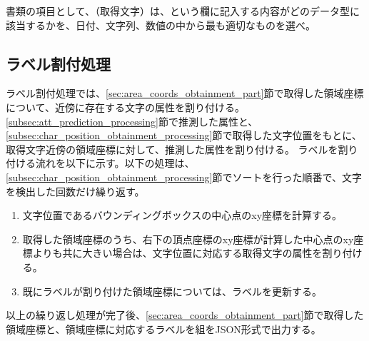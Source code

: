 書類の項目として、（取得文字）は、という欄に記入する内容がどのデータ型に該当するかを、日付、文字列、数値の中から最も適切なものを選べ。

\subsection{ラベル割付処理}\label{subsec:label_link_processing}
ラベル割付処理では、\ref{sec:area_coords_obtainment_part}節で取得した領域座標について、近傍に存在する文字の属性を割り付ける。
\ref{subsec:att_prediction_processing}節で推測した属性と、\ref{subsec:char_position_obtainment_processing}節で取得した文字位置をもとに、取得文字近傍の領域座標に対して、推測した属性を割り付ける。
ラベルを割り付ける流れを以下に示す。以下の処理は、\ref{subsec:char_position_obtainment_processing}節でソートを行った順番で、文字を検出した回数だけ繰り返す。

\begin{enumerate}
    \item 文字位置であるバウンディングボックスの中心点のxy座標を計算する。
    \item 取得した領域座標のうち、右下の頂点座標のxy座標が計算した中心点のxy座標よりも共に大きい場合は、文字位置に対応する取得文字の属性を割り付ける。
    \item 既にラベルが割り付けた領域座標については、ラベルを更新する。
\end{enumerate}

以上の繰り返し処理が完了後、\ref{sec:area_coords_obtainment_part}節で取得した領域座標と、領域座標に対応するラベルを組をJSON形式で出力する。
